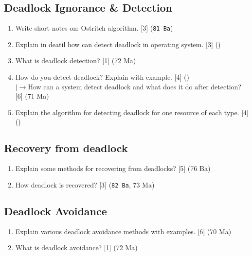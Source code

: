 \documentclass[12pt]{article}
\newcommand{\lb}{\\$\left|\rightarrow\right.$}
\begin{document}
	\subsection{Deadlock Ignorance \& Detection}
		\begin{enumerate}[noitemsep, topsep=0pt]
			\item Write short notes on: Ostritch algorithm. \hfill [3] (\texttt{81 Ba})
			
			\item Explain in deatil how can detect deadlock in operating system. \hfill [3] ()

			\item What is deadlock detection? \hfill [1] (72 Ma)

			\item How do you detect deadlock? Explain with example. \hfill [4] ()
			\lb How can a system detect deadlock and what does it do after detection? \hfill [6] (71 Ma)

			\item Explain the algorithm for detecting deadlock for one resource of each type. \hfill [4] ()
		\end{enumerate}

	\subsection{Recovery from deadlock}
		\begin{enumerate}[noitemsep, topsep=0pt]
			\item Explain some methods for recovering from deadlocks? \hfill [5] (76 Ba)

			\item How deadlock is recovered? \hfill [3] (\texttt{82 Ba}, 73 Ma)
		\end{enumerate}

	\subsection{Deadlock Avoidance}
		\begin{enumerate}[noitemsep, topsep=0pt]

			\item Explain various deadlock avoidance methods with examples. \hfill [6] (70 Ma)

			\item What is deadlock avoidance? \hfill [1] (72 Ma)
		\end{enumerate}
\end{document}
